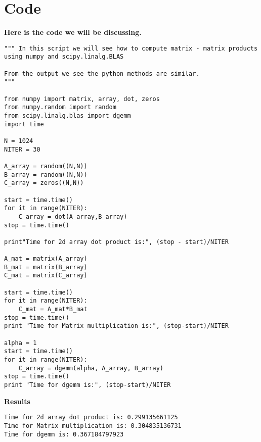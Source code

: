 \section{Code}
\begin{center}
\textbf{Here is the code we will be discussing.}
\begin{lstlisting}
""" In this script we will see how to compute matrix - matrix products
using numpy and scipy.linalg.BLAS 

From the output we see the python methods are similar.
"""

from numpy import matrix, array, dot, zeros
from numpy.random import random
from scipy.linalg.blas import dgemm
import time

N = 1024
NITER = 30

A_array = random((N,N))
B_array = random((N,N))
C_array = zeros((N,N))

start = time.time()
for it in range(NITER):
	C_array = dot(A_array,B_array)
stop = time.time()

print"Time for 2d array dot product is:", (stop - start)/NITER

A_mat = matrix(A_array)
B_mat = matrix(B_array)
C_mat = matrix(C_array)

start = time.time()
for it in range(NITER):
	C_mat = A_mat*B_mat
stop = time.time()
print "Time for Matrix multiplication is:", (stop-start)/NITER

alpha = 1
start = time.time()
for it in range(NITER):
	C_array = dgemm(alpha, A_array, B_array)
stop = time.time()
print "Time for dgemm is:", (stop-start)/NITER
\end{lstlisting}
\textbf{Results}
\begin{lstlisting}
Time for 2d array dot product is: 0.299135661125
Time for Matrix multiplication is: 0.304835136731
Time for dgemm is: 0.367184797923
\end{lstlisting}
\end{center}